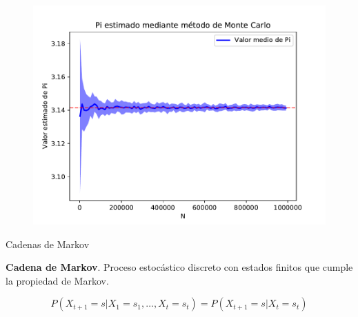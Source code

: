 \documentclass[11pt]{beamer}
\begin{document}
\begin{frame}
	\begin{figure}
		\includegraphics[scale=0.7]{images/pi_mc.pdf}
	\end{figure}
\end{frame}

\begin{frame}{Cadenas de Markov}
	
	\begin{definition} \textbf{Cadena de Markov}. Proceso estocástico discreto con estados finitos que cumple la propiedad de Markov. 

	\[P(X_{t+1} = s| X_1 = s_1, \dots ,X_t = s_t) = P(X_{t+1} = s |X_t = s_t) \]
		
	\end{definition}
	
\end{frame}
\end{document}
